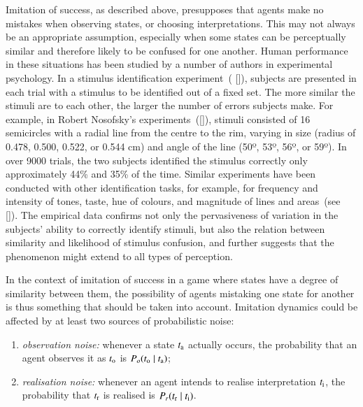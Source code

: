 \documentclass[12pt,english]{article}
\numberwithin{equation}{section}
\newcommand{\citepbjps}[1]{(\citeauthor{#1} [\citeyear{#1}])}
\newcommand{\citepbjpspre}[2]{(#1~\citeauthor{#2} [\citeyear{#2}])}
\newcommand{\citeyearparbjps}[1]{([\citeyear{#1}])}
\begin{document}
Imitation of success, as described above, presupposes that agents make no mistakes when
observing states, or choosing interpretations. This may not always be an appropriate
assumption, especially when some states can be perceptually similar and therefore likely to be
confused for one another.
Human performance in these situations has been studied by a number of authors in experimental psychology. %
In a stimulus identification experiment~\citepbjps{luce-detection-1963}, subjects are presented in each trial with a stimulus to be identified out of a fixed set.
The more similar the stimuli are to each other, the larger the number of errors subjects make.
For example, in Robert Nosofsky's experiments~\citeyearparbjps{Nosofsky1986:Attention-Simil}, stimuli consisted of 16 semicircles with a radial line from the centre to the rim, varying in size (radius of 0.478, 0.500, 0.522, or 0.544 cm) and angle of the line (50º, 53º, 56º, or 59º).
In over 9000 trials, the two subjects identified the stimulus correctly only approximately 44\% and 35\% of the time.
Similar experiments have been conducted with other identification tasks, for example, for frequency and intensity of tones, taste, hue of colours, and magnitude of lines and areas~\citepbjpspre{see}{donkin-why-2015}.
The empirical data confirms not only the pervasiveness of variation in the subjects' ability to correctly identify stimuli, but also the relation between similarity and likelihood of stimulus confusion, and further suggests that the phenomenon might extend to all types of perception.

In the context of imitation of success in a game where states have a degree of similarity between them, the possibility of agents mistaking one state for another is thus something that should be taken into account.
Imitation dynamics could be affected by at least two sources of probabilistic noise:

\begin{enumerate}
\item \emph{observation noise:} whenever a state $t_{\mathrm{a}}$ actually occurs, the probability
  that an agent observes it as $t_{\mathrm{o}}$ is $P_o(t_{\mathrm{o}} \mid t_{\mathrm{a}})$;
\item \emph{realisation noise:} whenever an agent intends to realise interpretation
  $t_{\mathrm{i}}$, the probability that $t_{\mathrm{r}}$ is realised is
  $P_r(t_{\mathrm{r}} \mid t_{\mathrm{i}})$.
\end{enumerate}
\end{document}
